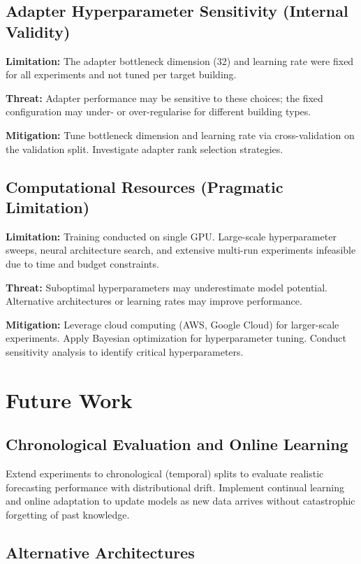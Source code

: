 \documentclass[12pt,a4paper]{report}
\begin{document}
\subsection{Adapter Hyperparameter Sensitivity (Internal Validity)}

\textbf{Limitation:} The adapter bottleneck dimension (32) and learning rate were fixed for all experiments and not tuned per target building.

\textbf{Threat:} Adapter performance may be sensitive to these choices; the fixed configuration may under- or over-regularise for different building types.

\textbf{Mitigation:} Tune bottleneck dimension and learning rate via cross-validation on the validation split. Investigate adapter rank selection strategies.

\subsection{Computational Resources (Pragmatic Limitation)}

\textbf{Limitation:} Training conducted on single GPU. Large-scale hyperparameter sweeps, neural architecture search, and extensive multi-run experiments infeasible due to time and budget constraints.

\textbf{Threat:} Suboptimal hyperparameters may underestimate model potential. Alternative architectures or learning rates may improve performance.

\textbf{Mitigation:} Leverage cloud computing (AWS, Google Cloud) for larger-scale experiments. Apply Bayesian optimization for hyperparameter tuning. Conduct sensitivity analysis to identify critical hyperparameters.

\section{Future Work}

\subsection{Chronological Evaluation and Online Learning}

Extend experiments to chronological (temporal) splits to evaluate realistic forecasting performance with distributional drift. Implement continual learning and online adaptation to update models as new data arrives without catastrophic forgetting of past knowledge.

\subsection{Alternative Architectures}
\end{document}
